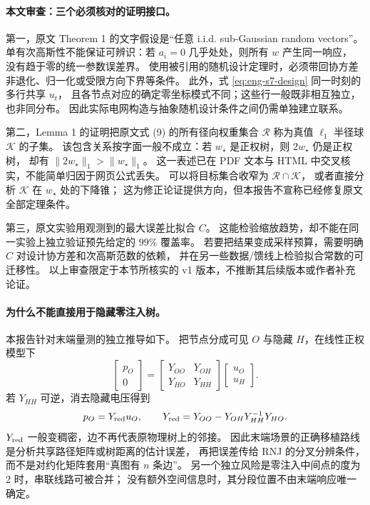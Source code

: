 \documentclass[UTF8,11pt,fontset=fandol]{ctexart}
\theoremstyle{remark}
\numberwithin{equation}{section}
\begin{document}
\paragraph{本文审查：三个必须核对的证明接口。}
第一，原文 Theorem 1 的文字假设是“任意 i.i.d. sub-Gaussian random vectors”。
单有次高斯性不能保证可辨识：若 $a_i=0$ 几乎处处，则所有 $w$ 产生同一响应，
没有趋于零的统一参数误差界。
使用被引用的随机设计定理时，必须带回协方差非退化、归一化或受限方向下界等条件。
此外，式 \eqref{eq:eng-s7-design} 同一时刻的多行共享 $u_t$，
且各节点对应的确定零坐标模式不同；这些行一般既非相互独立，也非同分布。
因此实际电网构造与抽象随机设计条件之间仍需单独建立联系。

第二，Lemma 1 的证明把原文式 (9) 的所有径向权重集合 $\mathcal R$
称为真值 $\ell_1$ 半径球 $\mathcal K$ 的子集。
该包含关系按字面一般不成立：若 $w_\star$ 是正权树，则 $2w_\star$ 仍是正权树，
却有 $\|2w_\star\|_1>\|w_\star\|_1$。
这一表述已在 PDF 文本与 HTML 中交叉核实，不能简单归因于网页公式丢失。
可以将目标集合收窄为 $\mathcal R\cap\mathcal K$，
或者直接分析 $\mathcal K$ 在 $w_\star$ 处的下降锥；
这为修正论证提供方向，但本报告不宣称已经修复原文全部定理条件。

第三，原文实验用观测到的最大误差比拟合 $C$。
这能检验缩放趋势，却不能在同一实验上独立验证预先给定的 $99\%$ 覆盖率。
若要把结果变成采样预算，需要明确 $C$ 对设计协方差和次高斯范数的依赖，
并在另一些数据/馈线上检验拟合常数的可迁移性。
以上审查限定于本节所核实的 v1 版本，不推断其后续版本或作者补充论证。

\paragraph{为什么不能直接用于隐藏零注入树。}
本报告针对末端量测的独立推导如下。
把节点分成可见 $O$ 与隐藏 $H$，在线性正权模型下
\begin{equation}
 \begin{bmatrix}p_O\\0\end{bmatrix}
 =\begin{bmatrix}Y_{OO}&Y_{OH}\\Y_{HO}&Y_{HH}\end{bmatrix}
 \begin{bmatrix}u_O\\u_H\end{bmatrix}.
 \label{eq:eng-s7-kron-start}
\end{equation}
若 $Y_{HH}$ 可逆，消去隐藏电压得到
\begin{equation}
 p_O=Y_{\rm red}u_O,\qquad
 Y_{\rm red}=Y_{OO}-Y_{OH}Y_{HH}^{-1}Y_{HO}.
 \label{eq:eng-s7-kron}
\end{equation}
$Y_{\rm red}$ 一般变稠密，边不再代表原物理树上的邻接。
因此末端场景的正确移植路线是分析共享路径矩阵或树距离的估计误差，
再把误差传给 RNJ 的分叉分辨条件，而不是对约化矩阵套用“真图有 $n$ 条边”。
另一个独立风险是零注入中间点的度为 2 时，串联线路可被合并；
没有额外空间信息时，其分段位置不由末端响应唯一确定。
\end{document}
